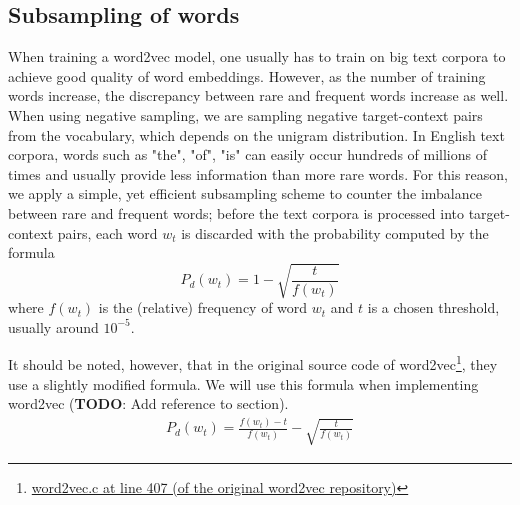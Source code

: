 \subsection{Subsampling of words}
When training a word2vec model, one usually has to train on big text corpora to achieve good quality of word embeddings. However, as the number of training words increase, the discrepancy between rare and frequent words increase as well. When using negative sampling, we are sampling negative target-context pairs from the vocabulary, which depends on the unigram distribution. In English text corpora, words such as "the", "of", "is" can easily occur hundreds of millions of times and usually provide less information than more rare words. For this reason, we apply a simple, yet efficient subsampling scheme to counter the imbalance between rare and frequent words; before the text corpora is processed into target-context pairs, each word $w_t$ is discarded with the probability computed by the formula \cite{mikolov2013b, levy-etal-2015-improving}
\begin{equation}
    P_d(w_t) = 1 - \sqrt{\frac{t}{f(w_t)}}
\end{equation}
where $f(w_t)$ is the (relative) frequency of word $w_t$ and $t$ is a chosen threshold, usually around $10^{-5}$.

It should be noted, however, that in the original source code of word2vec\footnote{\href{https://github.com/tmikolov/word2vec/blob/e092540633572b883e25b367938b0cca2cf3c0e7/word2vec.c\#L407}{word2vec.c at line 407 (of the original word2vec repository)}}, they use a slightly modified formula. We will use this formula when implementing word2vec (\textbf{TODO}: Add reference to section).
\begin{align}
    P_d(w_t) = \frac{f(w_t) - t}{f(w_t)} - \sqrt{\frac{t}{f(w_t)}}
\end{align}

